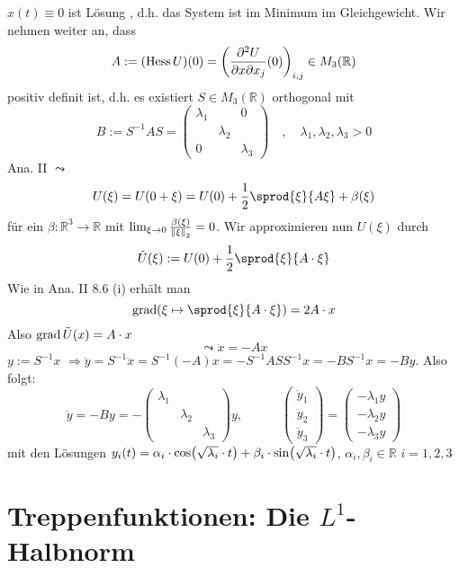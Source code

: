 $x(t)\equiv 0$ ist Lösung , d.h. das System ist im Minimum im Gleichgewicht. Wir nehmen weiter an, dass 
\[
	A := ( \hess U)(0) = \enbrace*{ \frac{\partial^2 U}{\partial x \partial x_j} (0)}_{i,j} \in M_3(\mathds{R})  
\]
positiv definit ist, d.h. es existiert $S \in M_3(\mathds{R})$ orthogonal mit 
\[
	B := S ^{-1} A S = \begin{pmatrix}
		\lambda_1 & & 0 \\
		& \lambda_2 & \\
		0 & & \lambda_3
	\end{pmatrix} \quad, \quad \lambda_1, \lambda_2, \lambda_3 >0
\]
Ana. II $\leadsto$
\[
	U(\xi)= U(0 + \xi) = U(0) + \frac{1}{2} \sprod{\xi}{A \xi} + \beta(\xi)  
\]
für ein $\beta : \mathds{R}^3 \to \mathds{R}$ mit $\lim_{ \xi \to 0} \frac{\beta(\xi)}{\norm[2]{\xi} } = 0 $. Wir approximieren nun $U(\xi)$ durch 
\[
	\tilde U (\xi) := U(0)+ \frac{1}{2} \sprod{\xi}{A \cdot \xi} 
\]
Wie in Ana. II 8.6 (i) erhält man 
\[
	\grad\enbrace*{\xi \mapsto \sprod{\xi}{A \cdot \xi} }  = 2 A \cdot x
\]
Also $\grad \tilde U (x) = A \cdot x$
\[
	\leadsto \ddot x = - A x
\]
$y := S ^{-1} x$ $\Rightarrow \ddot y = S ^{-1} \ddot x  = S ^{-1} (-A)x =- S ^{-1} A S S ^{-1} x = - B S ^{-1}  x = -B y$. Also folgt:
\[
	\ddot y = - B y = - \begin{pmatrix}
		\lambda_1 & & \\
		& \lambda_2 & \\
		& & \lambda_3
	\end{pmatrix}y, \qquad \quad \begin{pmatrix}
		\ddot y_1 \\
		\ddot y_2 \\
		\ddot y_3
	\end{pmatrix} = \begin{pmatrix}
		-\lambda_1 y \\
		-\lambda_2 y \\
		- \lambda_3 y
	\end{pmatrix}
\]
mit den Lösungen $y_i(t) = \alpha_i \cdot  \cos \enbrace*{\sqrt{\lambda_i}\cdot t  } + \beta_i \cdot \sin \enbrace*{\sqrt{\lambda_i} \cdot t  } $, $\alpha_i, \beta_i \in \mathds{R}$
$i=1,2,3$
\newpage

\section{Treppenfunktionen: Die $L^1$-Halbnorm} %
\label{sec:3}

